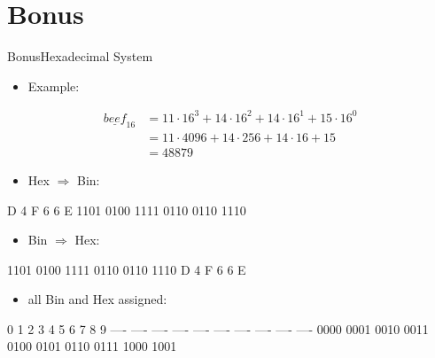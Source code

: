 
\section{Bonus}

\begin{frame}{Bonus}{Hexadecimal System}
  \begin{itemize}
    \item \alert{Example:}
  \end{itemize}
  \begin{dmath*}
    \begin{aligned}
      \underline{beef}_{16} &= 11 \cdot 16^3 + 14 \cdot 16^2 + 14 \cdot 16^1 + 15 \cdot 16^0 \\
      &= 11 \cdot 4096 + 14 \cdot 256 + 14 \cdot 16 + 15 \\
      &= 48879
    \end{aligned}
  \end{dmath*}

  \centering
  \begin{itemize}
    \item \alert{Hex $\Rightarrow$ Bin:}
  \end{itemize}
  \begin{terminal}
     D    4    F    6    6    E
  1101 0100 1111 0110 0110 1110
  \end{terminal}
  \begin{itemize}
    \item \alert{Bin $\Rightarrow$ Hex:}
  \end{itemize}
  \begin{terminal}
  1101 0100 1111 0110 0110 1110
     D    4    F    6    6    E
  \end{terminal}

  \begin{itemize}
    \item \alert{all Bin and Hex assigned:}
  \end{itemize}
  \begin{terminal}
  0    1    2    3    4    5    6    7    8    9
  ---- ---- ---- ---- ---- ---- ---- ---- ---- ----
  0000 0001 0010 0011 0100 0101 0110 0111 1000 1001


\end{terminal}
\end{frame}
